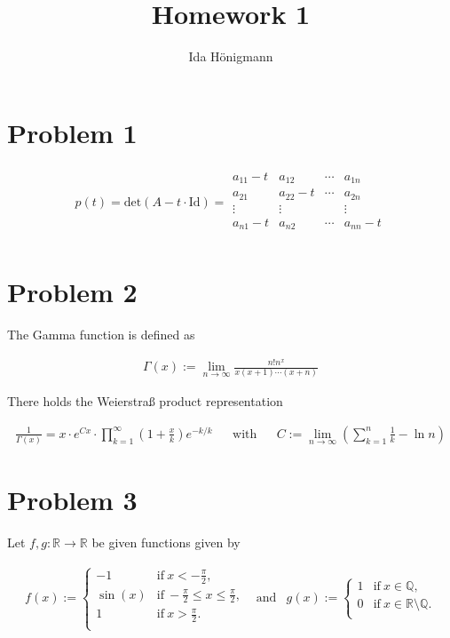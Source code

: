 \documentclass[]{article}
\title{Homework 1}
\author{Ida Hönigmann}
\begin{document}
\maketitle

\section*{Problem 1}

\begin{align*}
	p(t)=\textrm{det}(A-t \cdot \textrm{Id}) =
	\begin{array}{|cccc|}
		a_{11}-t & a_{12} & \cdots & a_{1n} \\
		a_{21} & a_{22} - t & \cdots & a_{2n} \\
		\vdots & \vdots & & \vdots \\
		a_{n1}-t & a_{n2} & \cdots & a_{nn} - t \\
	\end{array}
\end{align*}


\section*{Problem 2}

The Gamma function is defined as

\begin{align*}
	\Gamma (x) := \lim\limits_{n \to \infty} \frac{n! n^x}{x(x+1)\cdots (x+n)}
\end{align*}

\noindent
There holds the Weierstraß product representation

\begin{align*}
	\frac{1}{\Gamma (x)} = x \cdot e^{Cx} \cdot \prod_{k=1}^{\infty} (1 + \frac{x}{k}) e^{-k/k} && \textrm{with} && C := \lim\limits_{n \to \infty} (\sum_{k=1}^{n} \frac{1}{k} - \ln n)
\end{align*}


\section*{Problem 3}

Let $f,g : \mathbb{R} \to \mathbb{R}$ be given functions given by

\begin{align*}
	f(x) := \left\{
	\begin{array}{ll}
		-1 & \textrm{if}\ x < - \frac{\pi}{2}, \\
		\sin (x) & \textrm{if}\ - \frac{\pi}{2} \leq x \leq \frac{\pi}{2}, \\
		1 & \textrm{if}\ x > \frac{\pi}{2}. \\
	\end{array}
	\right. & \textrm{and} & 
	g(x) := \left\{
	\begin{array}{ll}
		1 & \textrm{if}\ x \in \mathbb{Q}, \\
		0 & \textrm{if}\ x \in \mathbb{R} \setminus \mathbb{Q}. \\
	\end{array}
	\right.
\end{align*}
\end{document}
